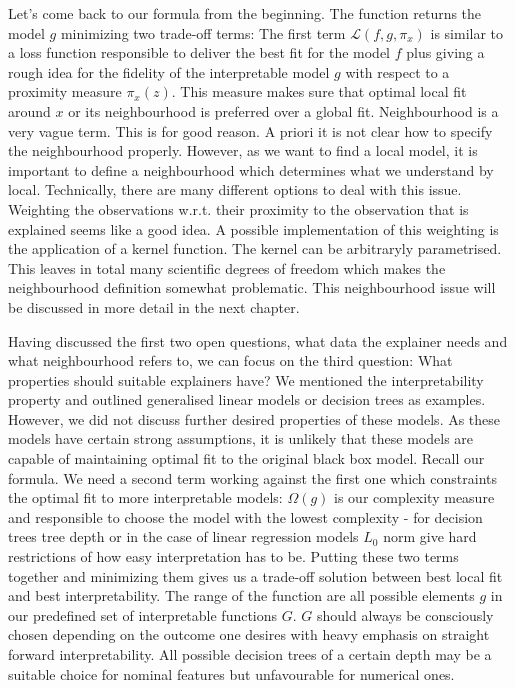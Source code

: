\documentclass[]{krantz}
\begin{document}
Let's come back to our formula from the beginning. The function returns
the model \(g\) minimizing two trade-off terms: The first term
\(\mathcal{L}\left(f, g, \pi_x \right)\) is similar to a loss function
responsible to deliver the best fit for the model \(f\) plus giving a
rough idea for the fidelity of the interpretable model \(g\) with
respect to a proximity measure \(\pi_x(z)\). This measure makes sure
that optimal local fit around \(x\) or its neighbourhood is preferred
over a global fit. Neighbourhood is a very vague term. This is for good
reason. A priori it is not clear how to specify the neighbourhood
properly. However, as we want to find a local model, it is important to
define a neighbourhood which determines what we understand by local.
Technically, there are many different options to deal with this issue.
Weighting the observations w.r.t. their proximity to the observation
that is explained seems like a good idea. A possible implementation of
this weighting is the application of a kernel function. The kernel can
be arbitraryly parametrised. This leaves in total many scientific
degrees of freedom which makes the neighbourhood definition somewhat
problematic. This neighbourhood issue will be discussed in more detail
in the next chapter.

Having discussed the first two open questions, what data the explainer
needs and what neighbourhood refers to, we can focus on the third
question: What properties should suitable explainers have? We mentioned
the interpretability property and outlined generalised linear models or
decision trees as examples. However, we did not discuss further desired
properties of these models. As these models have certain strong
assumptions, it is unlikely that these models are capable of maintaining
optimal fit to the original black box model. Recall our formula. We need
a second term working against the first one which constraints the
optimal fit to more interpretable models: \(\Omega\left(g\right)\) is
our complexity measure and responsible to choose the model with the
lowest complexity - for decision trees tree depth or in the case of
linear regression models \(L_0\) norm give hard restrictions of how easy
interpretation has to be. Putting these two terms together and
minimizing them gives us a trade-off solution between best local fit and
best interpretability. The range of the function are all possible
elements \(g\) in our predefined set of interpretable functions \(G\).
\(G\) should always be consciously chosen depending on the outcome one
desires with heavy emphasis on straight forward interpretability. All
possible decision trees of a certain depth may be a suitable choice for
nominal features but unfavourable for numerical ones.
\end{document}
